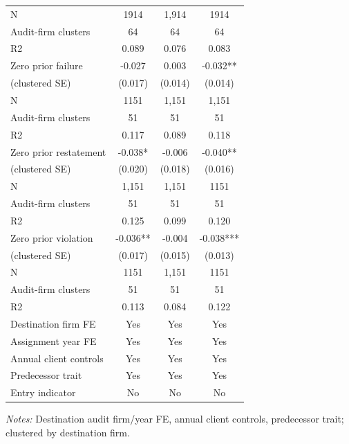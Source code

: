\documentclass[10pt]{article}
\begin{document}
\begin{minipage}{19cm}
\begin{threeparttable}
\begin{tabular}{p{}ccc}
N & 1914 & 1,914 & 1914 \\
Audit-firm clusters & 64 & 64 & 64 \\
R2 & 0.089 & 0.076 & 0.083 \\
Zero prior failure & -0.027 & 0.003 & -0.032** \\
(clustered SE) & (0.017) & (0.014) & (0.014) \\
N & 1151 & 1,151 & 1,151 \\
Audit-firm clusters & 51 & 51 & 51 \\
R2 & 0.117 & 0.089 & 0.118 \\
Zero prior restatement & -0.038* & -0.006 & -0.040** \\
(clustered SE) & (0.020) & (0.018) & (0.016) \\
N & 1,151 & 1,151 & 1151 \\
Audit-firm clusters & 51 & 51 & 51 \\
R2 & 0.125 & 0.099 & 0.120 \\
Zero prior violation & -0.036** & -0.004 & -0.038*** \\
(clustered SE) & (0.017) & (0.015) & (0.013) \\
N & 1151 & 1,151 & 1151 \\
Audit-firm clusters & 51 & 51 & 51 \\
R2 & 0.113 & 0.084 & 0.122 \\
Destination firm FE & Yes & Yes & Yes \\
Assignment year FE & Yes & Yes & Yes \\
Annual client controls & Yes & Yes & Yes \\
Predecessor trait & Yes & Yes & Yes \\
Entry indicator & No & No & No \\
\bottomrule
\end{tabular}
\begin{tablenotes}\fontsize{9}{11}\selectfont
\item \raggedright \fontsize{9}{11}\selectfont \textit{Notes:} Destination audit firm/year FE, annual client controls, predecessor trait; clustered by destination firm.
\end{tablenotes}
\end{threeparttable}

\end{minipage}
\end{document}
